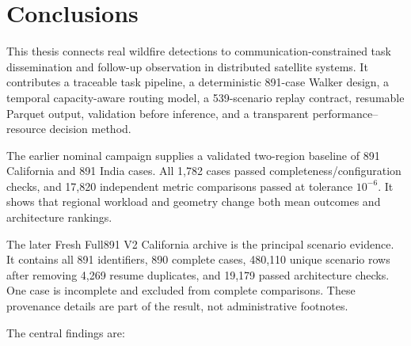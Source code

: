 \section{Conclusions}

This thesis connects real wildfire detections to communication-constrained task dissemination and follow-up observation in distributed satellite systems. It contributes a traceable task pipeline, a deterministic 891-case Walker design, a temporal capacity-aware routing model, a 539-scenario replay contract, resumable Parquet output, validation before inference, and a transparent performance--resource decision method.

The earlier nominal campaign supplies a validated two-region baseline of 891 California and 891 India cases. All 1,782 cases passed completeness/configuration checks, and 17,820 independent metric comparisons passed at tolerance $10^{-6}$. It shows that regional workload and geometry change both mean outcomes and architecture rankings.

The later Fresh Full891 V2 California archive is the principal scenario evidence. It contains all 891 identifiers, 890 complete cases, 480,110 unique scenario rows after removing 4,269 resume duplicates, and 19,179 passed architecture checks. One case is incomplete and excluded from complete comparisons. These provenance details are part of the result, not administrative footnotes.

The central findings are:

